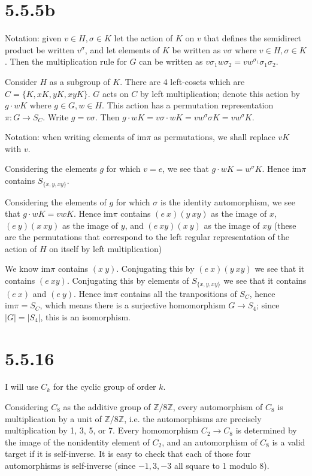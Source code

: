 \documentclass{article}
\def\Z{\mathbb{Z}}
\def\im{\textrm{im}}
\begin{document}
\section*{5.5.5b}

Notation: given $v \in H, \sigma \in K$ let the action of $K$ on $v$ that defines the semidirect product be written $v^\sigma$, and let elements of $K$ be written as $v \sigma$ where $v \in H, \sigma \in K$. Then the multiplication rule for $G$ can be written as $v \sigma_1 w \sigma_2 = vw^{\sigma_1} \sigma_1 \sigma_2$.

Consider $H$ as a subgroup of $K$. There are 4 left-cosets which are $C = \{K, xK, yK, xyK\}$. $G$ acts on $C$ by left multiplication; denote this action by $g \cdot wK$ where $g \in G, w \in H$. This action has a permutation representation $\pi : G \to S_C$. Write $g = v \sigma$. Then $g \cdot wK = v \sigma \cdot wK = vw^\sigma \sigma K = vw^\sigma K$. 

Notation: when writing elements of $\im \pi$ as permutations, we shall replace $vK$ with $v$.

Considering the elements $g$ for which $v = e$, we see that $g \cdot wK = w^\sigma K$. Hence $\im \pi$ contains $S_{\{x, y, xy\}}$.

Considering the elements of $g$ for which $\sigma$ is the identity automorphism, we see that $g \cdot wK = vwK$. Hence $\im \pi$ contains $(e\ x)(y\ xy)$ as the image of $x$, $(e\ y)(x\ xy)$ as the image of $y$, and $(e\ xy)(x\ y)$ as the image of $xy$ (these are the permutations that correspond to the left regular representation of the action of $H$ on itself by left multiplication)

We know $\im \pi$ contains $(x\ y)$. Conjugating this by $(e\ x)(y\ xy)$ we see that it contains $(e\ xy)$. Conjugating this by elements of $S_{\{x, y, xy\}}$ we see that it contains $(e\ x)$ and $(e\ y)$. Hence $\im \pi$ contains all the tranpositions of $S_C$, hence $\im \pi = S_C$, which means there is a surjective homomorphism $G \to S_4$; since $|G| = |S_4|$, this is an isomorphism.


\section*{5.5.16}

I will use $C_k$ for the cyclic group of order $k$.

Considering $C_8$ as the additive group of $\Z / 8 \Z$, every automorphism of $C_8$ is multiplication by a unit of $\Z / 8 \Z$, i.e. the automorphisms are precisely multiplication by 1, 3, 5, or 7. Every homomorphism $C_2 \to C_8$ is determined by the image of the nonidentity element of $C_2$, and an automorphism of $C_8$ is a valid target if it is self-inverse. It is easy to check that each of those four automorphisms is self-inverse (since $-1, 3, -3$ all square to 1 modulo 8).
\end{document}
